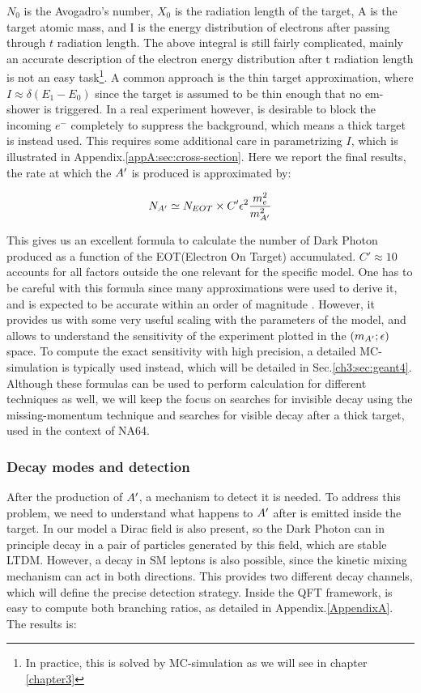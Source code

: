 $N_0$ is the Avogadro's number, $X_0$ is the radiation length of the target, A is the target atomic mass, and I is the energy distribution of electrons after passing through $t$ radiation length. The above integral is still fairly complicated, mainly an accurate description of the electron energy distribution after t radiation length is not an easy task\footnote{In practice, this is solved by MC-simulation as we will see in chapter \ref{chapter3}}. A common approach is the thin target approximation, where $I \approx \delta (E_1 - E_0)$ since the target is assumed to be thin enough that no em-shower is triggered. In a real experiment however, is desirable to block the incoming $e^-$ completely to suppress the background, which means a thick target is instead used. This requires some additional care in parametrizing $I$, which is illustrated in Appendix.\ref{appA:sec:cross-section}. Here we report the final results, the rate at which the $A'$ is produced is approximated by:

\begin{equation}
  \label{eq:dm-rate}
  N_{A'} \simeq N_{EOT} \times C' \epsilon^2 \frac{m_e^2}{m^2_{A'}}
\end{equation}

This gives us an excellent formula to calculate the number of Dark Photon produced as a function of the EOT(Electron On Target) accumulated. $C' \approx 10$ accounts for all factors outside the one relevant for the specific model. One has to be careful with this formula since many approximations were used to derive it, and is expected to be accurate within an order of magnitude \cite{jdb}. However, it provides us with some very useful scaling with the parameters of the model, and allows to understand the sensitivity of the experiment plotted in the $(m_{A'};\epsilon)$ space. To compute the exact sensitivity with high precision, a detailed MC-simulation is typically used instead, which will be detailed in Sec.\ref{ch3:sec:geant4}. Although these formulas can be used to perform calculation for different techniques as well, we will keep the focus on searches for invisible decay using the missing-momentum technique and searches for visible decay after a thick target, used in the context of NA64.

\subsubsection{Decay modes and detection}
\label{ch1:sec:dm-decay}

After the production of $A'$, a mechanism to detect it is needed. To address this problem, we need to understand what happens to $A'$ after is emitted inside the target. In our model a Dirac field is also present, so the Dark Photon can in principle decay in a pair of particles generated by this field, which are stable LTDM. However, a decay in SM leptons is also possible, since the kinetic mixing mechanism can act in both directions. This provides two different decay channels, which will define the precise detection strategy. Inside the QFT framework, is easy to compute both branching ratios, as detailed in Appendix.\ref{AppendixA}. The results is:

